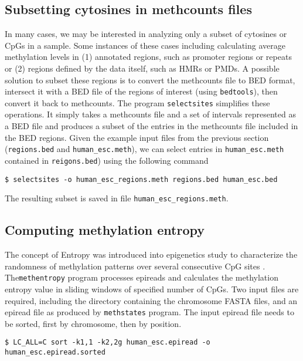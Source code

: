 \documentclass[10pt]{article}
\newcommand{\prog}[1]{\texttt{#1}}
\newcommand{\fn}[1]{\texttt{#1}}
\begin{document}
{{\subsection{Subsetting cytosines in methcounts files}
\label{sec:selectsites}

In many cases, we may be interested in analyzing only a subset of
cytosines or CpGs in a sample. Some instances of these cases
including calculating average methylation levels in (1) annotated regions,
such as promoter regions or repeats or (2) regions defined by the data
itself, such as HMRs or PMDs. A possible solution to subset these
regions is to convert the methcounts file to BED format, intersect it
with a BED file of the regions of interest (using \prog{bedtools}), then convert it back to
methcounts. The program \prog{selectsites} simplifies these
operations. It simply takes a methcounts file and a set of intervals
represented as a BED file and produces a subset of the entries in the
methcounts file included in the BED regions. Given the example input
files from the previous section (\fn{regions.bed} and
\fn{human\_esc.meth}), we can select entries in \fn{human\_esc.meth}
contained in \fn{reigons.bed}) using the following command
\begin{verbatim}
$ selectsites -o human_esc_regions.meth regions.bed human_esc.bed
\end{verbatim}
The resulting subset is saved in file \fn{human\_esc\_regions.meth}.


\subsection{Computing methylation entropy}
\label{sec:methentropy}
The concept of Entropy was introduced into epigenetics study to
characterize the randomness of methylation patterns over several
consecutive CpG sites \cite{xie2011}. The\prog{methentropy} program
processes epireads and calculates the methylation entropy value in
sliding windows of specified number of CpGs. Two input files are
required, including the directory containing the chromosome FASTA
files, and an epiread file as produced by \prog{methstates}
program. The input epiread file needs to be sorted, first by chromosome,
then by position.
\begin{verbatim}
$ LC_ALL=C sort -k1,1 -k2,2g human_esc.epiread -o human_esc.epiread.sorted
\end{verbatim} 

}}
\end{document}
